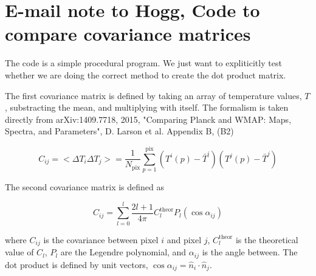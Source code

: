 \documentclass[a4paper, 11pt]{article}
\begin{document}

\section*{E-mail note to Hogg, Code to compare covariance matrices}

The code is a simple procedural program. We just want to expliticitly test whether we are doing the correct method to create the dot product matrix. 

The first covariance matrix is defined by taking an array of temperature values, $T$, substracting the mean, and multiplying with itself. The formalism is taken directly from arXiv:1409.7718, 2015, "Comparing Planck and WMAP: Maps, Spectra, and Parameters", D. Larson et al. Appendix B, (B2)

$$
C_{ij} = <\Delta T_i \Delta T_j > = \frac{1}{N_{\text{pix}}} \sum^{\text{pix}}_{p=1} (T^i(p)-\bar{T}^i) (T^j(p)-\bar{T}^j)
$$



The second covariance matrix is defined as 

$$
C_{ij}=\sum^{l}_{l=0} \frac{2l+1}{4\pi} C^{\text{theor}}_{l}P_{l}(\cos\alpha_{ij})
$$

where $C_{ij}$ is the covariance between pixel $i$ and pixel $j$,  $C^{\text{theor}}_{l}$ is the theoretical value of $C_l$, $P_{l}$  are the Legendre polynomial, and $\alpha_{ij}$ is the angle between. The dot product is defined by unit vectors, $\cos\alpha_{ij}=\hat{n}_{i}\cdot\hat{n}_{j}$. 
\end{document}
